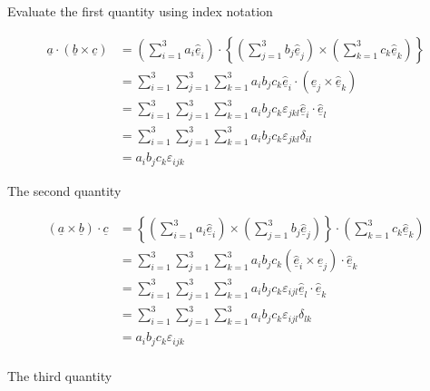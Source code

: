 Evaluate the first quantity using index notation

\begin{equation*}
  \begin{split}
    \underline{a}\cdot(\underline{b}\times\underline{c})
    &=\left(\sum_{i=1}^{3}a_{i}\underline{\hat{e}}_{i}\right)\cdot\left\{\left(\sum_{j=1}^{3}b_{j}\underline{\hat{e}}_{j}\right)\times\left(\sum_{k=1}^{3}c_{k}\underline{\hat{e}}_{k}\right)\right\} \\
    &=\sum_{i=1}^{3}\sum_{j=1}^{3}\sum_{k=1}^{3}a_{i}b_{j}c_{k}\underline{\hat{e}}_{i}\cdot(\underline{\hat{e}}_{j}\times\underline{\hat{e}}_{k}) \\
    &=\sum_{i=1}^{3}\sum_{j=1}^{3}\sum_{k=1}^{3}a_{i}b_{j}c_{k}\varepsilon_{jkl}\underline{\hat{e}}_{i}\cdot\underline{\hat{e}}_{l} \\
    &=\sum_{i=1}^{3}\sum_{j=1}^{3}\sum_{k=1}^{3}a_{i}b_{j}c_{k}\varepsilon_{jkl}\delta_{il} \\
    &=a_{i}b_{j}c_{k}\varepsilon_{ijk}
  \end{split}
\end{equation*}

The second quantity

\begin{equation*}
  \begin{split}
    (\underline{a}\times\underline{b})\cdot\underline{c}
    &=\left\{\left(\sum_{i=1}^{3}a_{i}\underline{\hat{e}}_{i}\right)\times\left(\sum_{j=1}^{3}b_{j}\underline{\hat{e}}_{j}\right)\right\}\cdot\left(\sum_{k=1}^{3}c_{k}\underline{\hat{e}}_{k}\right) \\
    &=\sum_{i=1}^{3}\sum_{j=1}^{3}\sum_{k=1}^{3}a_{i}b_{j}c_{k}(\underline{\hat{e}}_{i}\times\underline{\hat{e}}_{j})\cdot\underline{\hat{e}}_{k} \\
    &=\sum_{i=1}^{3}\sum_{j=1}^{3}\sum_{k=1}^{3}a_{i}b_{j}c_{k}\varepsilon_{ijl}\underline{\hat{e}}_{l}\cdot\underline{\hat{e}}_{k} \\
    &=\sum_{i=1}^{3}\sum_{j=1}^{3}\sum_{k=1}^{3}a_{i}b_{j}c_{k}\varepsilon_{ijl}\delta_{lk} \\
    &=a_{i}b_{j}c_{k}\varepsilon_{ijk} \\
  \end{split}
\end{equation*}

The third quantity

